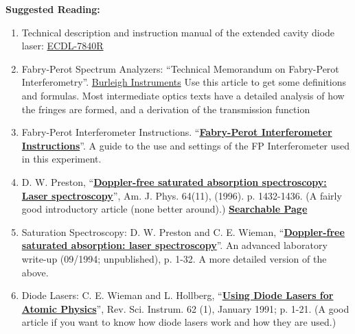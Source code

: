\documentclass{../lab}
\begin{document}
\noindent\textbf{Suggested Reading:}

\begin{enumerate}
    \item Technical description and instruction manual of the extended cavity diode laser: \href{http://physics111.lib.berkeley.edu/Physics111/Equipment_Manuals/manual_D1_ECDL_laser.pdf}{ECDL-7840R}

    \item Fabry-Perot Spectrum Analyzers: ``Technical Memorandum on Fabry-Perot Interferometry''. \href{http://experimentationlab.berkeley.edu/sites/default/files/tech-memo-fp-interferometry.pdf}{Burleigh Instruments} Use this article to get some definitions and formulas. Most intermediate optics texts have a detailed analysis of how the fringes are formed, and a derivation of the transmission function

    \item Fabry-Perot Interferometer Instructions. ``\href{http://physics111.lib.berkeley.edu/Physics111/Reprints/MNO/Fabry-Perot\_Instructions\_OCR.pdf}{\textbf{Fabry-Perot Interferometer Instructions}}''. A guide to the use and settings of the FP Interferometer used in this experiment.

    \item D. W. Preston, ``\href{http://ajp.aapt.org/resource/1/ajpias/v64/i11/p1432\_s1}{\textbf{Doppler-free saturated absorption spectroscopy: Laser spectroscopy}}'', Am. J. Phys. 64(11), (1996). p. 1432-1436. (A fairly good introductory article (none better around).) \href{http://physics111.lib.berkeley.edu/Physics111/Reprints/MNO/03-Doppler\_Free\_Saturated\_Absoprtion.pdf}{\textbf{Searchable Page}}

    \item Saturation Spectroscopy: D. W. Preston and C. E. Wieman, ``\href{http://physics111.lib.berkeley.edu/Physics111/Reprints/MNO/04-Doppler\_Free\_Saturated\_Absoprtion.pdf}{\textbf{Doppler-free saturated absorption: laser spectroscopy}}''. An advanced laboratory write-up (09/1994; unpublished), p. 1-32. A more detailed version of the above.

    \item Diode Lasers: C. E. Wieman and L. Hollberg, ``\href{http://physics111.lib.berkeley.edu/Physics111/Reprints/MNO/07-Using_Diode_Lasers.pdf}{\textbf{Using Diode Lasers for Atomic Physics}}'', Rev. Sci. Instrum. 62 (1), January 1991; p. 1-21. (A good article if you want to know how diode lasers work and how they are used.)


\end{enumerate}
\end{document}
